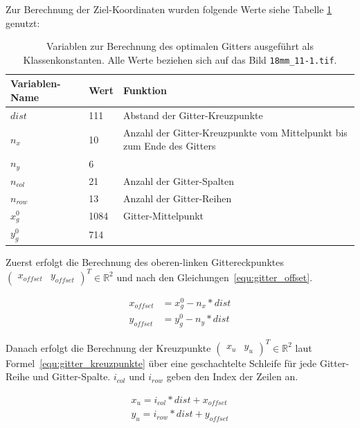 Zur Berechnung der Ziel-Koordinaten wurden folgende Werte siehe Tabelle \ref{tab:gitter_koordinaten_variablen} genutzt:

\begin{table}
\centering
\begin{tabular}{|l|l|p{}|}
\toprule
Variablen-Name & Wert & Funktion\\
\midrule
$dist$ & 111 & Abstand der Gitter-Kreuzpunkte\\
\midrule
$n_x$ & 10 & Anzahl der Gitter-Kreuzpunkte vom Mittelpunkt bis zum Ende des Gitters\\
$n_y$ & 6 & \\
\midrule
$n_{col}$ & 21 & Anzahl der Gitter-Spalten\\
$n_{row}$ & 13 & Anzahl der Gitter-Reihen\\
\midrule
$x_g^0$ & 1084 & Gitter-Mittelpunkt \\
$y_g^0$ & 714 & \\
\bottomrule
\end{tabular}
\caption{Variablen zur Berechnung des optimalen Gitters ausgeführt als Klassenkonstanten. Alle Werte beziehen sich auf das Bild \texttt{18mm\_11-1.tif}. }
\label{tab:gitter_koordinaten_variablen}
\end{table}

Zuerst erfolgt die Berechnung des oberen-linken Gittereckpunktes $\begin{pmatrix}
x_{offset} & y_{offset}\end{pmatrix}^T \in \mathbb{R}^2$ und nach den Gleichungen~\ref{equ:gitter_offset}. 

\begin{equation}
\label{equ:gitter_offset}
\begin{aligned}
x_{offset} &= x_g^0 - n_x * dist\\
y_{offset} &= y_g^0 - n_y * dist
\end{aligned}
\end{equation}

Danach erfolgt die Berechnung der Kreuzpunkte $\begin{pmatrix}x_{u} & y_{u}\end{pmatrix}^T \in \mathbb{R}^2$ laut Formel~\ref{equ:gitter_kreuzpunkte} über eine geschachtelte Schleife für jede Gitter-Reihe und Gitter-Spalte. $i_{col}$ und $i_{row}$ geben den Index der Zeilen an.

\begin{equation}
\label{equ:gitter_kreuzpunkte}
\begin{split}
x_{u} = i_{col} * dist + x_{offset}\\
y_{u} = i_{row} * dist + y_{offset}
\end{split}
\end{equation}

